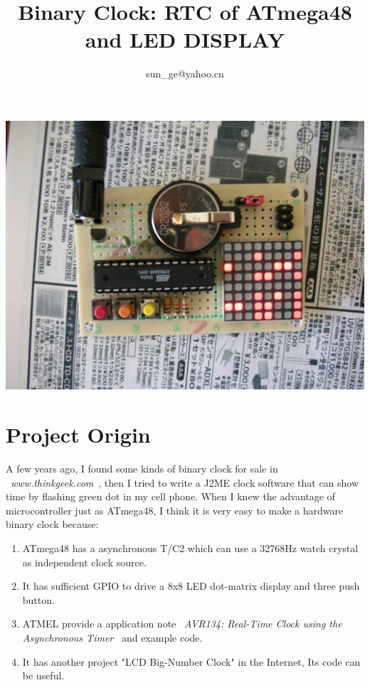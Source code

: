 \documentclass[11pt,a4paper]{article}
\title{Binary Clock: RTC of ATmega48 and LED DISPLAY}
\author{sun\_ge@yahoo.cn}
\begin{document}
\maketitle

\begin{center}
\includegraphics{binclock.jpg}
\end{center}

\section{Project Origin}
A few years ago, I found some kinds of binary clock for sale in ~\textit{www.thinkgeek.com}~,
then I tried to write a J2ME clock software that can show time by flashing green dot in my cell phone.
When I knew the advantage of microcontroller just as ATmega48, I think it is very easy to 
make a hardware binary clock because: \\
\begin{enumerate}
\item ATmega48 has a asynchronous T/C2 which can use a 32768Hz watch crystal as independent clock source.
\item It has sufficient GPIO to drive a 8x8 LED dot-matrix display and three push button.
\item ATMEL provide a application note ~\textit{AVR134: Real-Time Clock using the Asynchronous Timer}~ and
example code.
\item It has another project "LCD Big-Number Clock" in the Internet, Its code can be useful.
\end{enumerate}
\end{document}
